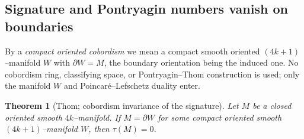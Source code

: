 \documentclass[12pt]{article}
\newtheorem{theorem}{Theorem}
\theoremstyle{definition}
\begin{document}
\subsection*{Signature and Pontryagin numbers vanish on boundaries}

By a \emph{compact oriented cobordism} we mean a compact smooth oriented
$(4k{+}1)$--manifold $W$ with $\partial W=M$, the boundary orientation being the induced
one.  No cobordism ring, classifying space, or Pontryagin--Thom construction is used; only
the manifold $W$ and Poincar\'e--Lefschetz duality enter.

\begin{theorem}[Thom; cobordism invariance of the signature]\label{thm:cobinv}
Let $M$ be a closed oriented smooth $4k$--manifold.  If $M=\partial W$ for some compact
oriented smooth $(4k{+}1)$--manifold $W$, then $\tau(M)=0$.
\end{theorem}
\end{document}
